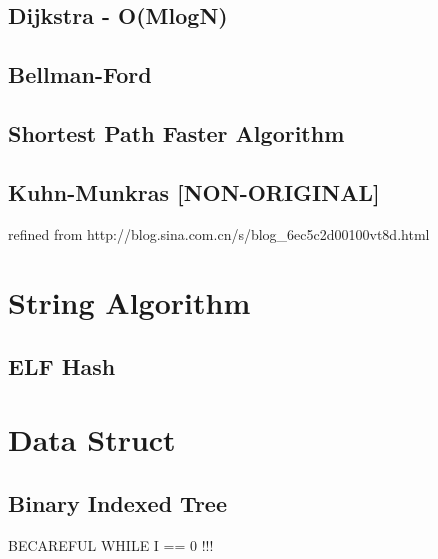 \documentclass[a4paper]{article}
\begin{document}
\subsection{Dijkstra - O(MlogN)}

\subsection{Bellman-Ford}

\subsection{Shortest Path Faster Algorithm}

\subsection{Kuhn-Munkras [NON-ORIGINAL]}
refined from http://blog.sina.com.cn/s/blog\_6ec5c2d00100vt8d.html

\section{String Algorithm}
\subsection{ELF Hash}

\section{Data Struct}
\subsection {Binary Indexed Tree}
BECAREFUL WHILE I == 0 !!!

\end{document}
